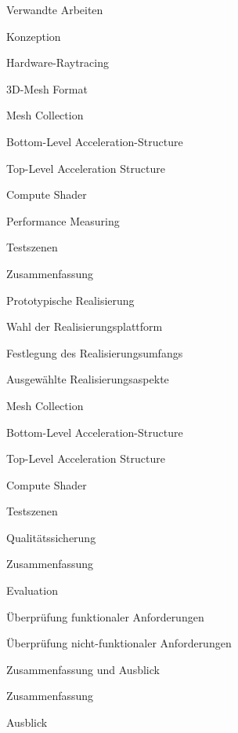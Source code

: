 \documentclass[11pt]{scrartcl}
\begin{document}
\begin{gliederung}
		\item Verwandte Arbeiten
		
		\item Konzeption
		\begin{gliederung}
			\item Hardware-Raytracing
			\begin{gliederung}
				\item 3D-Mesh Format
				\item Mesh Collection
				\item Bottom-Level Acceleration-Structure
				\item Top-Level Acceleration Structure
				\item Compute Shader
				\item Performance Measuring
				\item Testszenen
			\end{gliederung}
			\item Zusammenfassung
		\end{gliederung}
		
		\item Prototypische Realisierung
		\begin{gliederung}
			\item Wahl der Realisierungsplattform
			\item Festlegung des Realisierungsumfangs
			\item Ausgewählte Realisierungsaspekte
			\begin{gliederung}
				\item Mesh Collection
				\item Bottom-Level Acceleration-Structure
				\item Top-Level Acceleration Structure
				\item Compute Shader
				\item Testszenen
			\end{gliederung}
			\item Qualitätssicherung
			\item Zusammenfassung
		\end{gliederung}
		
		\item Evaluation
		\begin{gliederung}
			\item Überprüfung funktionaler Anforderungen
			\item Überprüfung nicht-funktionaler Anforderungen
		\end{gliederung}
		
		\item Zusammenfassung und Ausblick
		\begin{gliederung}
			\item Zusammenfassung
			\item Ausblick
		\end{gliederung}
		
	\end{gliederung}
	
\end{document}

